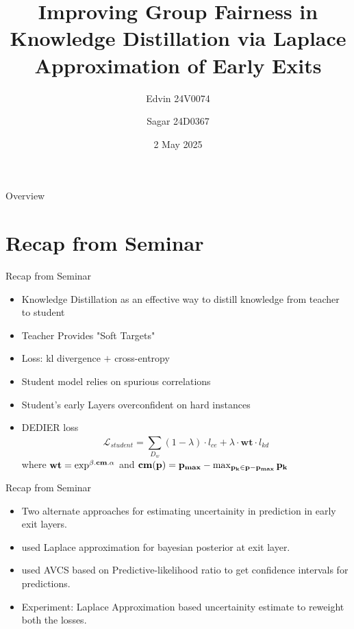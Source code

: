 \documentclass[aspectratio=169,xcolor=dvipsnames]{beamer}
\title{Improving Group Fairness in Knowledge Distillation
via Laplace Approximation of Early Exits}
\author{ Edvin 24V0074 \and Sagar 24D0367 }
\institute
{
    CS 769 \\
    Optimization in Machine Learning %
}
\date{2 May 2025} %
\begin{document}
\begin{frame}
    \titlepage
\end{frame}

\begin{frame}{Overview}
    \tableofcontents
\end{frame}

\section{Recap from Seminar}

\begin{frame}{Recap from Seminar}
    \begin{itemize}
        \item<1-> Knowledge Distillation as an effective way to distill knowledge from teacher to student%
        \item<2-> Teacher Provides "Soft Targets"
        \item<3-> Loss: kl divergence $+$ cross-entropy
        \item<4-> Student model relies on spurious correlations
        \item<5-> Student's early Layers overconfident on hard instances
        \item<6-> DEDIER loss
        \[ \mathcal{L}_{student} =
          \sum_{D_w}^{} (1- \lambda) \cdot l_{ce} 
          + \lambda \cdot \textbf{wt} \cdot l_{kd} \] 
          where \(\bf{wt} = \exp^{\beta.\bf{cm}.\alpha} \) and \(\bf{cm(p)} = p_{max} - \max_{p_k \in \bf{p} - p_{max}} p_k \) 
    \end{itemize}
\end{frame}

\begin{frame}{Recap from Seminar}
    \begin{itemize}
        \item<1-> Two alternate approaches for estimating uncertainity in prediction in early exit layers.
        \item<2-> \cite{meronen_fixing_2023} used Laplace approximation for bayesian posterior at exit layer.
        \item<3-> \cite{jazbec_early-exit_2024} used AVCS based on Predictive-likelihood ratio to get confidence intervals for predictions.
        \item<4-> Experiment: Laplace Approximation based uncertainity estimate to reweight both the losses.
    \end{itemize}
\end{frame}
\end{document}
